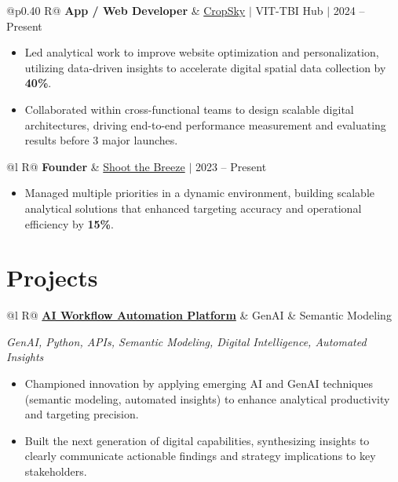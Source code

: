 \documentclass[a4paper,10pt]{article}
\newcommand{\ulink}[2]{\href{#1}{#2}}
\newcommand{\subheading}[1]{{\color[HTML]{0A0A0A}\fontsize{12}{14}\selectfont\bfseries #1}}
\newcommand{\techstack}[1]{{\color[HTML]{5C5C5C}\fontsize{10.5}{12.5}\selectfont\itshape #1}}
\newcommand{\meta}[1]{{\color[HTML]{5C5C5C}\fontsize{10.5}{12.5}\selectfont #1}}
\begin{document}
\begin{tabularx}{\linewidth}{@{}p{0.40\linewidth} R@{}}
\subheading{App / Web Developer} & \meta{\ulink{https://sites.google.com/view/cropsky/home}{CropSky} $|$ VIT-TBI Hub $|$ 2024 -- Present}
\end{tabularx}
\begin{itemize}[nosep, leftmargin=1.5em, itemsep=2pt, topsep=2pt]
  \item {\color[HTML]{0A0A0A}\fontsize{11}{14}\selectfont Led analytical work to improve website optimization and personalization, utilizing data-driven insights to accelerate digital spatial data collection by \textbf{40\%}.}
  \item {\color[HTML]{0A0A0A}\fontsize{11}{14}\selectfont Collaborated within cross-functional teams to design scalable digital architectures, driving end-to-end performance measurement and evaluating results before 3 major launches.}
\end{itemize}

\begin{tabularx}{\linewidth}{@{}l R@{}}
\subheading{Founder} & \meta{\ulink{https://shoot-the-breeze.vercel.app}{Shoot the Breeze} $|$ 2023 -- Present}
\end{tabularx}
\begin{itemize}[nosep, leftmargin=1.5em, itemsep=2pt, topsep=2pt]
  \item {\color[HTML]{0A0A0A}\fontsize{11}{14}\selectfont Managed multiple priorities in a dynamic environment, building scalable analytical solutions that enhanced targeting accuracy and operational efficiency by \textbf{15\%}.}
\end{itemize}

\section{Projects}
\vspace{2pt}

\begin{tabularx}{\linewidth}{@{}l R@{}}
\subheading{\ulink{https://github.com/su-jin1425/AI-Workflow-Automation-Platform}{AI Workflow Automation Platform}} & \meta{GenAI \& Semantic Modeling}
\end{tabularx}
\techstack{GenAI, Python, APIs, Semantic Modeling, Digital Intelligence, Automated Insights}
\begin{itemize}[nosep, leftmargin=1.5em, itemsep=2pt, topsep=2pt]
  \item {\color[HTML]{0A0A0A}\fontsize{11}{14}\selectfont Championed innovation by applying emerging AI and GenAI techniques (semantic modeling, automated insights) to enhance analytical productivity and targeting precision.}
  \item {\color[HTML]{0A0A0A}\fontsize{11}{14}\selectfont Built the next generation of digital capabilities, synthesizing insights to clearly communicate actionable findings and strategy implications to key stakeholders.}
\end{itemize}
\end{document}
